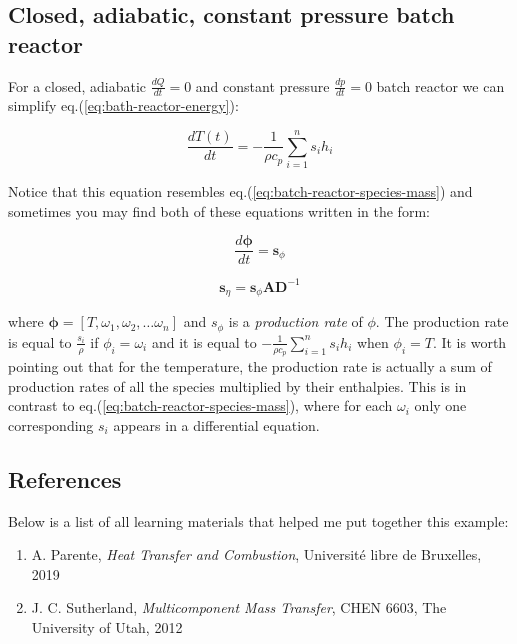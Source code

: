 \subsection{Closed, adiabatic, constant pressure batch reactor}

For a closed, adiabatic $\frac{dQ}{dt} = 0$ and constant pressure $\frac{dp}{dt}= 0$ batch reactor we can simplify eq.(\ref{eq:bath-reactor-energy}):

\begin{equation} \label{eq:bath-reactor-adiabatic-constant-pressure}
 \frac{d T(t)}{dt}  = - \frac{1}{\rho c_{p}} \sum_{i=1}^n  s_i  h_i 
\end{equation}

Notice that this equation resembles eq.(\ref{eq:batch-reactor-species-mass}) and sometimes you may find both of these equations written in the form:

\begin{equation} \label{eq:bath-reactor-adiabatic-constant-pressure}
 \frac{d \boldsymbol{\phi}}{dt}  = \mathbf{s}_{\phi}
\end{equation}

\begin{equation} \label{eq:bath-reactor-adiabatic-constant-pressure}
\mathbf{s}_{\eta} = \mathbf{s}_{\phi} \mathbf{A} \mathbf{D}^{-1}
\end{equation}

where $ \boldsymbol{\phi} = [T, \omega_1, \omega_2, \dots \omega_n]$ and $s_{\phi}$ is a \textit{production rate} of $\phi$. The production rate is equal to $\frac{s_i}{\rho}$ if $\phi_i = \omega_i$ and it is equal to $ - \frac{1}{\rho c_{p}} \sum_{i=1}^n  s_i  h_i $ when $\phi_i = T$. It is worth pointing out that for the temperature, the production rate is actually a sum of production rates of all the species multiplied by their enthalpies. This is in contrast to eq.(\ref{eq:batch-reactor-species-mass}), where for each $\omega_i$ only one corresponding $s_i$ appears in a differential equation.

\subsection{References}

Below is a list of all learning materials that helped me put together this example:

\begin{enumerate}
\item A. Parente, \textit{Heat Transfer and Combustion}, Université libre de Bruxelles, 2019
\item J. C. Sutherland, \textit{Multicomponent Mass Transfer}, CHEN 6603, The University of Utah, 2012
\end{enumerate}